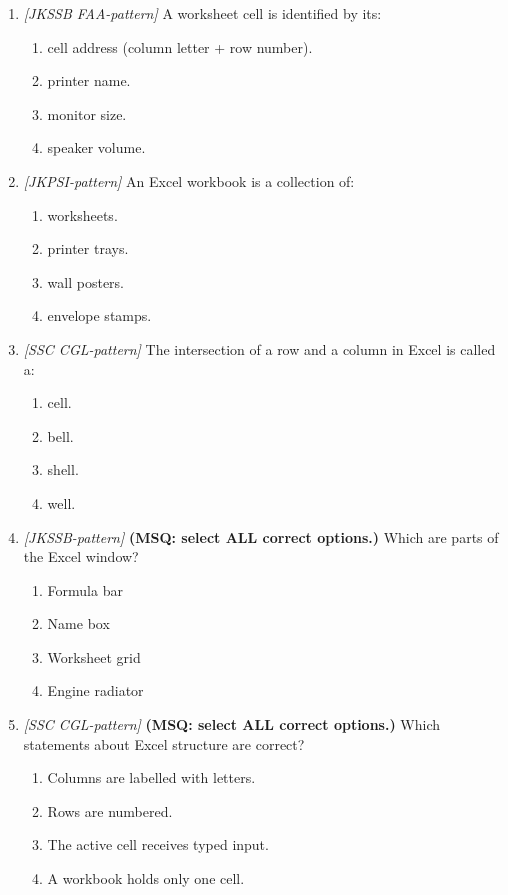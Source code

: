 \documentclass[11pt]{article}
\begin{document}
\begin{enumerate}[label=\textbf{Q\arabic*.}, leftmargin=*]
\item \textit{[JKSSB FAA-pattern]} A worksheet cell is identified by its:
  \begin{enumerate}[label=\Alph*.]
    \item cell address (column letter + row number).
    \item printer name.
    \item monitor size.
    \item speaker volume.
  \end{enumerate}
\item \textit{[JKPSI-pattern]} An Excel workbook is a collection of:
  \begin{enumerate}[label=\Alph*.]
    \item worksheets.
    \item printer trays.
    \item wall posters.
    \item envelope stamps.
  \end{enumerate}
\item \textit{[SSC CGL-pattern]} The intersection of a row and a column in Excel is called a:
  \begin{enumerate}[label=\Alph*.]
    \item cell.
    \item bell.
    \item shell.
    \item well.
  \end{enumerate}
\item \textit{[JKSSB-pattern]} \textbf{(MSQ: select ALL correct options.)} Which are parts of the Excel window?
  \begin{enumerate}[label=\Alph*.]
    \item Formula bar
    \item Name box
    \item Worksheet grid
    \item Engine radiator
  \end{enumerate}
\item \textit{[SSC CGL-pattern]} \textbf{(MSQ: select ALL correct options.)} Which statements about Excel structure are correct?
  \begin{enumerate}[label=\Alph*.]
    \item Columns are labelled with letters.
    \item Rows are numbered.
    \item The active cell receives typed input.
    \item A workbook holds only one cell.
  \end{enumerate}
\end{enumerate}
\def\JKSSBLessonID{24}\def\JKSSBAnswers{0}
\end{document}
